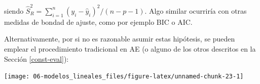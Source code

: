 \documentclass[
]{book}
\newenvironment{Shaded}{\begin{snugshade}}{\end{snugshade}}
\newcommand{\AttributeTok}[1]{\textcolor[rgb]{0.77,0.63,0.00}{#1}}
\newcommand{\CommentTok}[1]{\textcolor[rgb]{0.56,0.35,0.01}{\textit{#1}}}
\newcommand{\DecValTok}[1]{\textcolor[rgb]{0.00,0.00,0.81}{#1}}
\newcommand{\FunctionTok}[1]{\textcolor[rgb]{0.00,0.00,0.00}{#1}}
\newcommand{\NormalTok}[1]{#1}
\newcommand{\OtherTok}[1]{\textcolor[rgb]{0.56,0.35,0.01}{#1}}
\newcommand{\SpecialCharTok}[1]{\textcolor[rgb]{0.00,0.00,0.00}{#1}}
\newcommand{\StringTok}[1]{\textcolor[rgb]{0.31,0.60,0.02}{#1}}
\theoremstyle{break}
\theoremstyle{definition}
\theoremstyle{definition}
\theoremstyle{definition}
\theoremstyle{definition}
\theoremstyle{remark}
\begin{document}
siendo \(\hat{S}_{R}^{2}=\sum_{i=1}^{n}(y_{i}-\hat{y}_{i})^{2}/(n - p - 1)\).
Algo similar ocurriría con otras medidas de bondad de ajuste, como por ejemplo BIC o AIC.

Alternativamente, por si no es razonable asumir estas hipótesis, se pueden emplear el procedimiento tradicional en AE (o alguno de los otros descritos en la Sección \ref{const-eval}):

\begin{Shaded}
\end{Shaded}

\begin{center}\texttt{[image: 06-modelos\_lineales\_files/figure-latex/unnamed-chunk-23-1]} \end{center}
\end{document}
